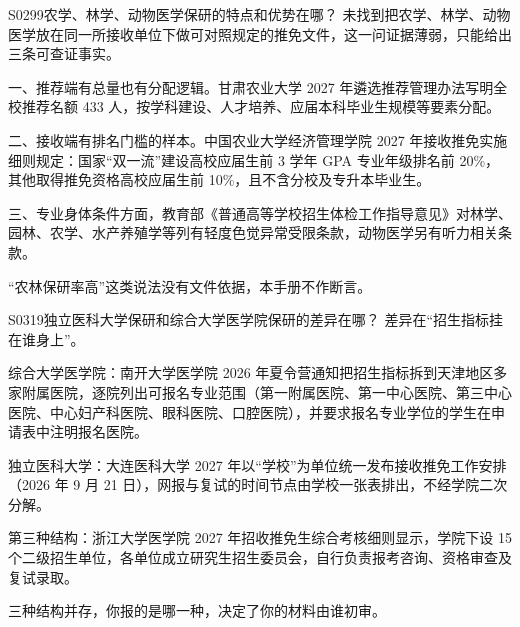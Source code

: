 \begin{qa}{S0299}{农学、林学、动物医学保研的特点和优势在哪？}
未找到把农学、林学、动物医学放在同一所接收单位下做可对照规定的推免文件，这一问证据薄弱，只能给出三条可查证事实。

一、推荐端有总量也有分配逻辑。甘肃农业大学 2027 年遴选推荐管理办法写明全校推荐名额 433 人，按学科建设、人才培养、应届本科毕业生规模等要素分配。

二、接收端有排名门槛的样本。中国农业大学经济管理学院 2027 年接收推免实施细则规定：国家“双一流”建设高校应届生前 3 学年 GPA 专业年级排名前 20\%，其他取得推免资格高校应届生前 10\%，且不含分校及专升本毕业生。

三、专业身体条件方面，教育部《普通高等学校招生体检工作指导意见》对林学、园林、农学、水产养殖学等列有轻度色觉异常受限条款，动物医学另有听力相关条款。

“农林保研率高”这类说法没有文件依据，本手册不作断言。
\end{qa}

\begin{qa}{S0319}{独立医科大学保研和综合大学医学院保研的差异在哪？}
差异在“招生指标挂在谁身上”。

综合大学医学院：南开大学医学院 2026 年夏令营通知把招生指标拆到天津地区多家附属医院，逐院列出可报名专业范围（第一附属医院、第一中心医院、第三中心医院、中心妇产科医院、眼科医院、口腔医院），并要求报名专业学位的学生在申请表中注明报名医院。

独立医科大学：大连医科大学 2027 年以“学校”为单位统一发布接收推免工作安排（2026 年 9 月 21 日），网报与复试的时间节点由学校一张表排出，不经学院二次分解。

第三种结构：浙江大学医学院 2027 年招收推免生综合考核细则显示，学院下设 15 个二级招生单位，各单位成立研究生招生委员会，自行负责报考咨询、资格审查及复试录取。

三种结构并存，你报的是哪一种，决定了你的材料由谁初审。
\end{qa}

